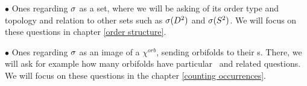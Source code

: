 $\bullet$ Ones regarding ${\sigma}$ as a set, where we will be asking 
of its order type and topology and relation to other sets such as ${{\sigma}(D^2)}$ and ${{\sigma}(S^2)}$. 
We will focus on these questions in chapter \ref{order structure}. 

$\bullet$ Ones regarding ${\sigma}$ as an image of a $\chi^{orb}$, sending orbifolds to their \Eoc s. 
There, we will ask for example how many orbifolds have particular \Eoc\ and 
related questions. We will focus on these questions in the chapter \ref{counting occurrences}.  






